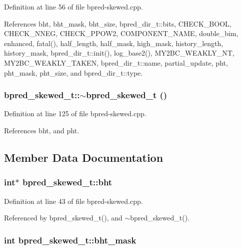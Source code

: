 Definition at line 56 of file bpred-skewed.cpp.

References bht, bht\_\-mask, bht\_\-size, bpred\_\-dir\_\-t::bits, CHECK\_\-BOOL, CHECK\_\-NNEG, CHECK\_\-PPOW2, COMPONENT\_\-NAME, double\_\-bim, enhanced, fatal(), half\_\-length, half\_\-mask, high\_\-mask, history\_\-length, history\_\-mask, bpred\_\-dir\_\-t::init(), log\_\-base2(), MY2BC\_\-WEAKLY\_\-NT, MY2BC\_\-WEAKLY\_\-TAKEN, bpred\_\-dir\_\-t::name, partial\_\-update, pht, pht\_\-mask, pht\_\-size, and bpred\_\-dir\_\-t::type.
\subsubsection[{$\sim$bpred\_\-skewed\_\-t}]{\setlength{\rightskip}{0pt plus 5cm}bpred\_\-skewed\_\-t::$\sim$bpred\_\-skewed\_\-t ()\hspace{0.3cm}{\tt  [inline]}}\label{classbpred__skewed__t_7d5f991a0175552d817213a31a4405db}




Definition at line 125 of file bpred-skewed.cpp.

References bht, and pht.

\subsection{Member Data Documentation}
\subsubsection[{bht}]{\setlength{\rightskip}{0pt plus 5cm}int$\ast$ {\bf bpred\_\-skewed\_\-t::bht}\hspace{0.3cm}{\tt  [protected]}}\label{classbpred__skewed__t_bc1bfc5b5c066817eb46fb4268bca179}




Definition at line 43 of file bpred-skewed.cpp.

Referenced by bpred\_\-skewed\_\-t(), and $\sim$bpred\_\-skewed\_\-t().
\subsubsection[{bht\_\-mask}]{\setlength{\rightskip}{0pt plus 5cm}int {\bf bpred\_\-skewed\_\-t::bht\_\-mask}\hspace{0.3cm}{\tt  [protected]}}\label{classbpred__skewed__t_357896e066061c336cf59d05059bc3b7}




